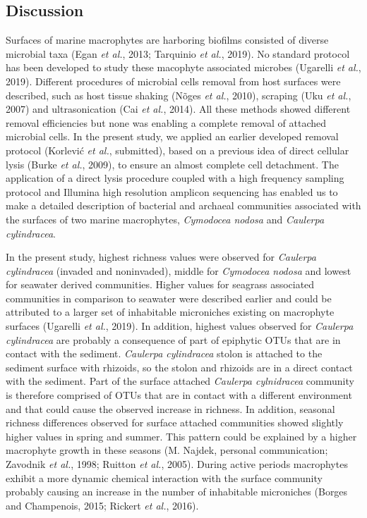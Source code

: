 \documentclass[12pt,]{article}
\begin{document}
\newpage

\hypertarget{discussion}{%
\subsection{Discussion}\label{discussion}}

Surfaces of marine macrophytes are harboring biofilms consisted of
diverse microbial taxa (Egan \emph{et al.}, 2013; Tarquinio \emph{et
al.}, 2019). No standard protocol has been developed to study these
macophyte associated microbes (Ugarelli \emph{et al.}, 2019). Different
procedures of microbial cells removal from host surfaces were described,
such as host tissue shaking (Nõges \emph{et al.}, 2010), scraping (Uku
\emph{et al.}, 2007) and ultrasonication (Cai \emph{et al.}, 2014). All
these methods showed different removal efficiencies but none was
enabling a complete removal of attached microbial cells. In the present
study, we applied an earlier developed removal protocol (Korlević
\emph{et al.}, submitted), based on a previous idea of direct cellular
lysis (Burke \emph{et al.}, 2009), to ensure an almost complete cell
detachment. The application of a direct lysis procedure coupled with a
high frequency sampling protocol and Illumina high resolution amplicon
sequencing has enabled us to make a detailed description of bacterial
and archaeal communities associated with the surfaces of two marine
macrophytes, \emph{Cymodocea nodosa} and \emph{Caulerpa cylindracea}.

In the present study, highest richness values were observed for
\emph{Caulerpa cylindracea} (invaded and noninvaded), middle for
\emph{Cymodocea nodosa} and lowest for seawater derived communities.
Higher values for seagrass associated communities in comparison to
seawater were described earlier and could be attributed to a larger set
of inhabitable microniches existing on macrophyte surfaces (Ugarelli
\emph{et al.}, 2019). In addition, highest values observed for
\emph{Caulerpa cylindracea} are probably a consequence of part of
epiphytic OTUs that are in contact with the sediment. \emph{Caulerpa
cylindracea} stolon is attached to the sediment surface with rhizoids,
so the stolon and rhizoids are in a direct contact with the sediment.
Part of the surface attached \emph{Caulerpa cylnidracea} community is
therefore comprised of OTUs that are in contact with a different
environment and that could cause the observed increase in richness. In
addition, seasonal richness differences observed for surface attached
communities showed slightly higher values in spring and summer. This
pattern could be explained by a higher macrophyte growth in these
seasons (M. Najdek, personal communication; Zavodnik \emph{et al.},
1998; Ruitton \emph{et al.}, 2005). During active periods macrophytes
exhibit a more dynamic chemical interaction with the surface community
probably causing an increase in the number of inhabitable microniches
(Borges and Champenois, 2015; Rickert \emph{et al.}, 2016).
\end{document}
